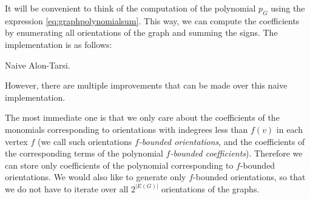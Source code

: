 It will be convenient to think of the computation of the polynomial $p_G$ using the expression \eqref{eq:graphpolynomialsum}. This way, we can compute the 
coefficients by enumerating all orientations of the graph and summing the signs.  The implementation is as follows:

\begin{algorithm}
\caption{Naive Alon-Tarsi.}
\SetAlgoLined
{}
\end{algorithm}

However, there are multiple improvements that can be made over this naive implementation.

The most immediate one is that we only care about the coefficients of the monomials
corresponding to orientations with indegrees less than $f(v)$ in each vertex $f$ 
(we call such orientations \emph{$f$-bounded orientations}, and the coefficients of the 
corresponding terms of the polynomial
\emph{$f$-bounded coefficients}).
Therefore we can store only coefficients of the polynomial corresponding to $f$-bounded orientations.
We would also like to generate only $f$-bounded orientations, so that we do not have to iterate over all 
$2^|E(G)|$ orientations of the graphs. 

